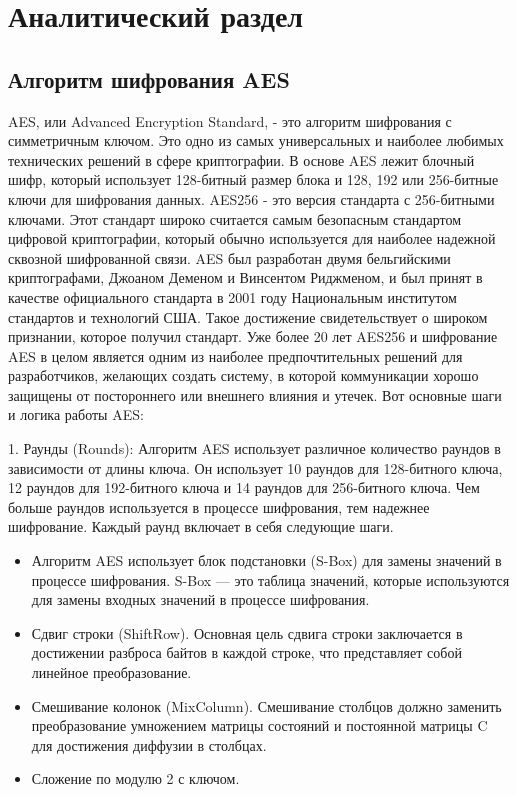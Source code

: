 \chapter{Аналитический раздел}
\label{cha:analysis}

\section{Алгоритм шифрования AES}

AES, или Advanced Encryption Standard, - это алгоритм шифрования с симметричным ключом. Это одно из самых универсальных и наиболее любимых технических решений в сфере криптографии.
В основе AES лежит блочный шифр, который использует 128-битный размер блока и 128, 192 или 256-битные ключи для шифрования данных. AES256 - это версия стандарта с 256-битными ключами. Этот стандарт широко считается самым безопасным стандартом цифровой криптографии, который обычно используется для наиболее надежной сквозной шифрованной связи.
AES был разработан двумя бельгийскими криптографами, Джоаном Деменом и Винсентом Риджменом, и был принят в качестве официального стандарта в 2001 году Национальным институтом стандартов и технологий США. Такое достижение свидетельствует о широком признании, которое получил стандарт. Уже более 20 лет AES256 и шифрование AES в целом является одним из наиболее предпочтительных решений для разработчиков, желающих создать систему, в которой коммуникации хорошо защищены от постороннего или внешнего влияния и утечек. Вот основные шаги и логика работы AES:

1. Раунды (Rounds):
Алгоритм AES использует различное количество раундов в зависимости от длины ключа. Он использует 10 раундов для 128-битного ключа, 12 раундов для 192-битного ключа и 14 раундов для 256-битного ключа. Чем больше раундов используется в процессе шифрования, тем надежнее шифрование. Каждый раунд включает в себя следующие шаги.
\begin{itemize}
	\item Алгоритм AES использует блок подстановки (S-Box) для замены значений в процессе шифрования. S-Box --- это таблица значений, которые используются для замены входных значений в процессе шифрования.
	\item Сдвиг строки (ShiftRow). Основная цель сдвига строки заключается в достижении разброса байтов в каждой строке, что представляет собой линейное преобразование.
	\item Смешивание колонок (MixColumn). Смешивание столбцов должно заменить преобразование умножением матрицы состояний и постоянной матрицы C для достижения диффузии в столбцах.
	\item Сложение по модулю 2 с ключом.
\end{itemize}

